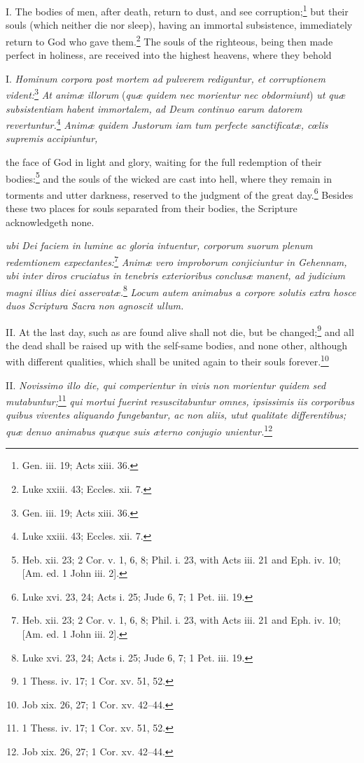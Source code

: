 I. The bodies of men, after death, return to dust, and see corruption;\footnote{Gen. iii. 19; Acts xiii. 36.} but their souls (which neither die nor sleep), having an immortal subsistence, immediately return to God who gave them.\footnote{Luke xxiii. 43; Eccles. xii. 7.} The souls of the righteous, being then made perfect in holiness, are received into the highest heavens, where they behold

I. \emph{Hominum corpora post mortem ad pulverem rediguntur, et corruptionem vident:}\footnote{Gen. iii. 19; Acts xiii. 36.}\emph{ At animæ illorum }(\emph{quæ quidem nec morientur nec obdormiunt})\emph{ ut quæ subsistentiam habent immortalem, ad Deum continuo earum datorem revertuntur.}\footnote{Luke xxiii. 43; Eccles. xii. 7.}\emph{ Animæ quidem Justorum iam tum perfecte sanctificatæ, cœlis supremis accipiuntur, }

the face of God in light and glory, waiting for the full redemption of their bodies:\footnote{Heb. xii. 23; 2 Cor. v. 1, 6, 8; Phil. i. 23, with Acts iii. 21 and Eph. iv. 10; [Am. ed. 1 John iii. 2].} and the souls of the wicked are cast into hell, where they remain in torments and utter darkness, reserved to the judgment of the great day.\footnote{Luke xvi. 23, 24; Acts i. 25; Jude 6, 7; 1 Pet. iii. 19.} Besides these two places for souls separated from their bodies, the Scripture acknowledgeth none.

\emph{ubi Dei faciem in lumine ac gloria intuentur, corporum suorum plenum redemtionem expectantes:}\footnote{Heb. xii. 23; 2 Cor. v. 1, 6, 8; Phil. i. 23, with Acts iii. 21 and Eph. iv. 10; [Am. ed. 1 John iii. 2].}\emph{ Animæ vero improborum conjiciuntur in Gehennam, ubi inter diros cruciatus in tenebris exterioribus conclusæ manent, ad judicium magni illius diei asservatæ.}\footnote{Luke xvi. 23, 24; Acts i. 25; Jude 6, 7; 1 Pet. iii. 19.}\emph{ Locum autem animabus a corpore solutis extra hosce duos Scriptura Sacra non agnoscit ullum.}

II. At the last day, such as are found alive shall not die, but be changed;\footnote{1 Thess. iv. 17; 1 Cor. xv. 51, 52.} and all the dead shall be raised up with the self-same bodies, and none other, although with different qualities, which shall be united again to their souls forever.\footnote{Job xix. 26, 27; 1 Cor. xv. 42–44.}

II. \emph{Novissimo illo die, qui comperientur in vivis non morientur quidem sed mutabuntur;}\footnote{1 Thess. iv. 17; 1 Cor. xv. 51, 52.}\emph{ qui mortui fuerint resuscitabuntur omnes, ipsissimis iis corporibus quibus viventes aliquando fungebantur, ac non aliis, utut qualitate differentibus; quæ denuo animabus quæque suis æterno conjugio unientur.}\footnote{Job xix. 26, 27; 1 Cor. xv. 42–44.}

